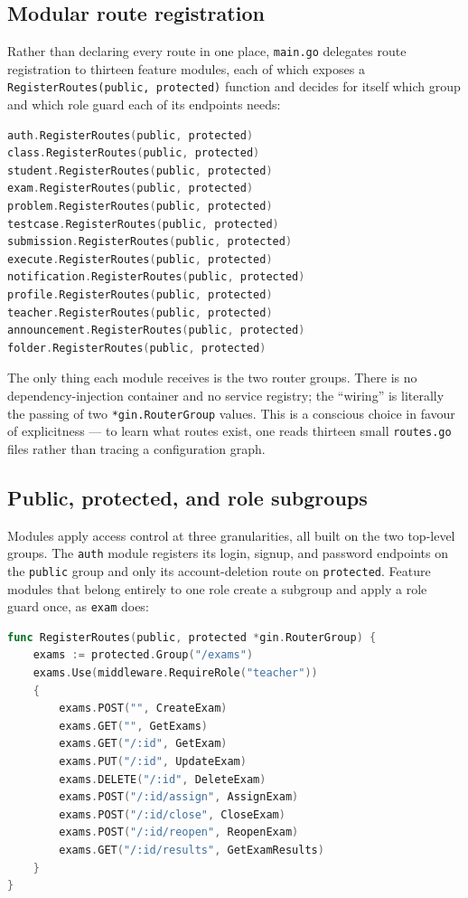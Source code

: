 \subsection{Modular route registration}

Rather than declaring every route in one place, \texttt{main.go} delegates route
registration to thirteen feature modules, each of which exposes a
\texttt{RegisterRoutes(public, protected)} function and decides for itself which
group and which role guard each of its endpoints needs:

\begin{lstlisting}[language=Go,caption={Modular route registration in \texttt{main.go}.},label={lst:register}]
auth.RegisterRoutes(public, protected)
class.RegisterRoutes(public, protected)
student.RegisterRoutes(public, protected)
exam.RegisterRoutes(public, protected)
problem.RegisterRoutes(public, protected)
testcase.RegisterRoutes(public, protected)
submission.RegisterRoutes(public, protected)
execute.RegisterRoutes(public, protected)
notification.RegisterRoutes(public, protected)
profile.RegisterRoutes(public, protected)
teacher.RegisterRoutes(public, protected)
announcement.RegisterRoutes(public, protected)
folder.RegisterRoutes(public, protected)
\end{lstlisting}

The only thing each module receives is the two router groups. There is no
dependency-injection container and no service registry; the ``wiring'' is
literally the passing of two \texttt{*gin.RouterGroup} values. This is a
conscious choice in favour of explicitness --- to learn what routes exist, one
reads thirteen small \texttt{routes.go} files rather than tracing a
configuration graph.

\subsection{Public, protected, and role subgroups}

Modules apply access control at three granularities, all built on the two
top-level groups. The \texttt{auth} module registers its login, signup, and
password endpoints on the \texttt{public} group and only its account-deletion
route on \texttt{protected}. Feature modules that belong entirely to one role
create a subgroup and apply a role guard once, as \texttt{exam} does:

\begin{lstlisting}[language=Go,caption={A whole module gated to one role in \texttt{internal/exam/routes.go}.},label={lst:examroutes}]
func RegisterRoutes(public, protected *gin.RouterGroup) {
    exams := protected.Group("/exams")
    exams.Use(middleware.RequireRole("teacher"))
    {
        exams.POST("", CreateExam)
        exams.GET("", GetExams)
        exams.GET("/:id", GetExam)
        exams.PUT("/:id", UpdateExam)
        exams.DELETE("/:id", DeleteExam)
        exams.POST("/:id/assign", AssignExam)
        exams.POST("/:id/close", CloseExam)
        exams.POST("/:id/reopen", ReopenExam)
        exams.GET("/:id/results", GetExamResults)
    }
}
\end{lstlisting}

